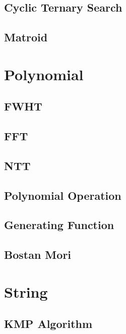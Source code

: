 \documentclass{article}
\begin{document}
\subsection{Cyclic Ternary Search}


\subsection{Matroid}


\section{Polynomial}

\subsection{FWHT}


\subsection{FFT}


\subsection{NTT}


\subsection{Polynomial Operation}


\subsection{Generating Function}


\subsection{Bostan Mori}


\section{String}

\subsection{KMP Algorithm}

\end{document}
